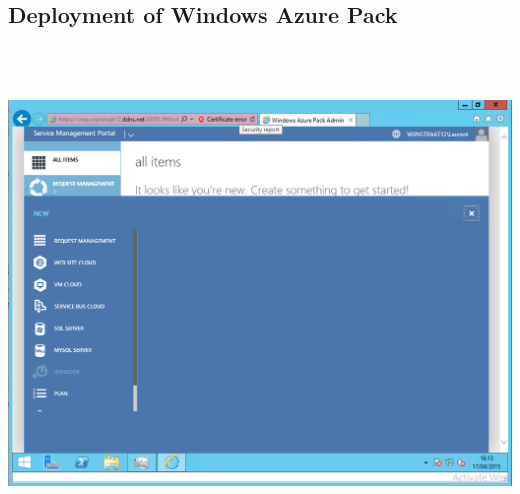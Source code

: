 \documentclass[11pt, a4paper]{article}
\begin{document}
 \subsection{Deployment of Windows Azure Pack}
$\;$ \\ \\
\noindent\begin{minipage}{\textwidth}
    \centering
    \includegraphics[width=\textwidth]{Azure_1.png}
\end{minipage}
$\;$ \\ \\
\end{document}
